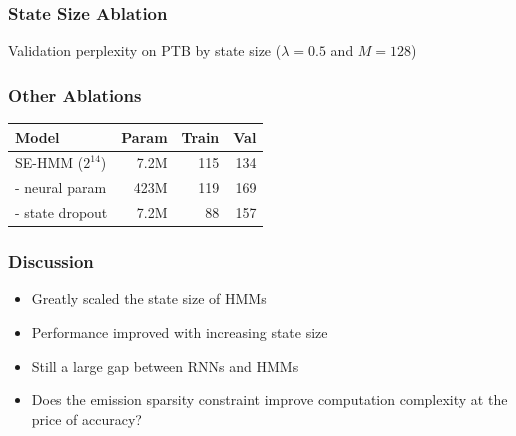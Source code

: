 \documentclass{beamer}
\begin{document}
\begin{frame}
\frametitle{State Size Ablation}

\centering
{}

\vspace{2em}

Validation perplexity on PTB by state size ($\lambda =0.5$ and $M=128$)
\end{frame}

\begin{frame}
\frametitle{Other Ablations}

\begin{center}
\begin{tabular}{lrrr}
\toprule
Model                 & Param & Train & Val\\
\midrule
SE-HMM ($2^{14}$)     & 7.2M & 115    & 134 \\
\quad - neural param  & 423M & 119    & 169 \\
\quad - state dropout & 7.2M & 88     & 157 \\
\bottomrule
\end{tabular}
\end{center}
\end{frame}

\begin{frame}
\frametitle{Discussion}
\begin{itemize}
\item Greatly scaled the state size of HMMs
\vspace{2em}
\item Performance improved with increasing state size
\vspace{2em}
\item Still a large gap between RNNs and HMMs
\vspace{2em}
\item Does the emission sparsity constraint improve
    computation complexity at the price of accuracy?
\end{itemize}
\end{frame}
\end{document}
